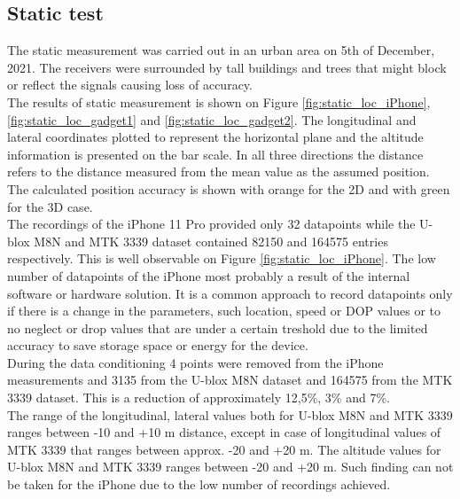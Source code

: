 \documentclass{article}
\begin{document}
		\subsection{Static test}
			The static measurement was carried out in an urban area on 5th of December, 2021. The receivers were surrounded by tall buildings and trees that might block or reflect the signals causing loss of accuracy. \\	
			The results of static measurement is shown on Figure \ref{fig:static_loc_iPhone}, \ref{fig:static_loc_gadget1} and \ref{fig:static_loc_gadget2}. The longitudinal and lateral coordinates plotted to represent the horizontal plane and the altitude information is presented on the bar scale. In all three directions the distance refers to the distance measured from the mean value as the assumed position. The calculated position accuracy is shown with orange for the 2D and with green for the 3D case. \\
			The recordings of the iPhone 11 Pro provided only 32 datapoints while the U-blox M8N and MTK 3339 dataset contained 82150 and 164575 entries respectively. This is well observable on Figure \ref{fig:static_loc_iPhone}. The low number of datapoints of the iPhone most probably a result of the internal software or hardware solution. It is a common approach to record datapoints only if there is a change in the parameters, such location, speed or DOP values or to no neglect or drop values that are under a certain treshold due to the limited accuracy to save storage space or energy for the device.\\
			During the data conditioning 4 points were removed from the iPhone measurements and 3135 from the U-blox M8N dataset and 164575 from the MTK 3339 dataset. This is a reduction of approximately 12,5\%, 3\% and 7\%. \\
			The range of the longitudinal, lateral values both for U-blox M8N and MTK 3339 ranges between -10 and +10 m distance, except in case of longitudinal values of MTK 3339 that ranges between approx. -20 and +20 m. The altitude values for U-blox M8N and MTK 3339 ranges between -20 and +20 m. Such finding can not be taken for the iPhone due to the low number of recordings achieved. \\
\end{document}
